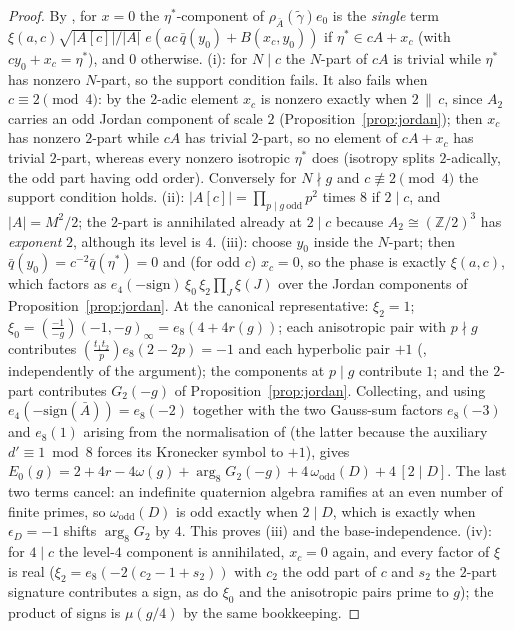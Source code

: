 \documentclass[11pt,reqno]{amsart}
\theoremstyle{plain}
\theoremstyle{definition}
\newcommand{\Z}{\mathbb{Z}}
\begin{document}
\begin{proof}
By \cite[Thm.~6.4]{Stromberg2013}, for $x=0$ the $\eta^*$-component of
$\rho_{\bar A}(\widetilde\gamma)e_0$ is the \emph{single} term
$\xi(a,c)\sqrt{|A[c]|/|A|}\;e(ac\,\bar q(y_0)+B(x_c,y_0))$ if
$\eta^*\in cA+x_c$ (with $cy_0+x_c=\eta^*$), and $0$ otherwise. (i): for $N\mid c$ the $N$-part of $cA$ is trivial while $\eta^*$ has nonzero
$N$-part, so the support condition fails. It also fails when $c\equiv2\pmod4$: by
\cite[Lem.~2.4]{Stromberg2013} the $2$-adic element $x_c$ is nonzero exactly when
$2\,\|\,c$, since $A_2$ carries an odd Jordan component of scale $2$
(Proposition~\ref{prop:jordan}); then $x_c$ has nonzero $2$-part while $cA$ has trivial
$2$-part, so no element of $cA+x_c$ has trivial $2$-part, whereas every nonzero isotropic
$\eta^*$ does (isotropy splits $2$-adically, the odd part having odd order). Conversely
for $N\nmid g$ and $c\not\equiv2\pmod4$ the support condition holds. (ii):
$|A[c]|=\prod_{p\mid g\ \mathrm{odd}}p^2$ times $8$ if $2\mid c$, and
$|A|=M^2/2$; the $2$-part is annihilated already at $2\mid c$ because $A_2\cong(\Z/2)^3$
has \emph{exponent} $2$, although its level is $4$. (iii): choose $y_0$ inside the $N$-part; then
$\bar q(y_0)=c^{-2}\bar q(\eta^*)=0$ and (for odd $c$) $x_c=0$, so the phase is exactly
$\xi(a,c)$, which \cite[Def.~6.1]{Stromberg2013} factors as
$e_4(-\mathrm{sign})\,\xi_0\,\xi_2\prod_J\xi(J)$ over the Jordan components of
Proposition~\ref{prop:jordan}. At the canonical representative: $\xi_2=1$;
$\xi_0=(\tfrac{-1}{-g})(-1,-g)_\infty=e_8(4+4r(g))$; each anisotropic pair with
$p\nmid g$ contributes $(\tfrac{t_1t_2}p)e_8(2-2p)=-1$ and each hyperbolic pair $+1$
(\cite[Lem.~3.6]{Stromberg2013}, independently of the argument); the components at
$p\mid g$ contribute $1$; and the $2$-part contributes $G_2(-g)$ of
Proposition~\ref{prop:jordan}. Collecting, and using
$e_4(-\mathrm{sign}(\bar A))=e_8(-2)$ together with the two Gauss-sum factors
$e_8(-3)$ and $e_8(1)$ arising from the normalisation of
\cite[eq.~(6.6)]{Stromberg2013} (the latter because the auxiliary $d'\equiv1\bmod 8$
forces its Kronecker symbol to $+1$), gives
$E_0(g)=2+4r-4\omega(g)+\arg_8G_2(-g)+4\,\omega_{\mathrm{odd}}(D)+4\,[2\mid D]$. The last
two terms cancel: an indefinite quaternion algebra ramifies at an even number of finite
primes, so $\omega_{\mathrm{odd}}(D)$ is odd exactly when $2\mid D$, which is exactly when
$\epsilon_D=-1$ shifts $\arg_8G_2$ by $4$. This proves (iii) and the base-independence.
(iv): for $4\mid c$ the level-$4$ component is annihilated, $x_c=0$ again, and every
factor of $\xi$ is real ($\xi_2=e_8(-2(c_2-1+s_2))$ with $c_2$ the odd part of $c$ and
$s_2$ the $2$-part signature contributes a sign, as do $\xi_0$ and the anisotropic pairs
prime to $g$); the product of signs is $\mu(g/4)$ by the same bookkeeping.
\end{proof}
\end{document}
